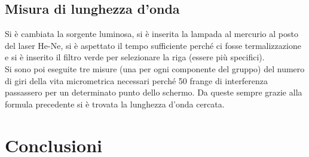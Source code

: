 \documentclass[10pt,a4paper]{article}
\begin{document}
\subsection{Misura di lunghezza d'onda}
Si è cambiata la sorgente luminosa, si è inserita la lampada al mercurio al posto del laser He-Ne, si è aspettato il tempo sufficiente perché ci fosse termalizzazione e si è inserito il filtro verde per selezionare la riga (essere più specifici).\\
Si sono poi eseguite tre misure (una per ogni componente del gruppo) del numero di giri della vita micrometrica necessari perché 50 frange di interferenza passassero per un determinato punto dello schermo. Da queste sempre grazie alla formula precedente si è trovata la lunghezza d'onda cercata.

\section{Conclusioni}
\end{document}
